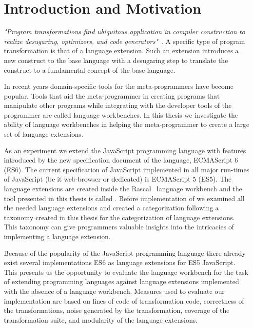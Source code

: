 
\chapter{Introduction and Motivation}

\label{Chapter1}


\textit{"Program transformations find ubiquitous application in compiler construction to realize desugaring, optimizers, and code generators"}~\cite{Erdweg2014}. A specific type of program transformation is that of a language extension. Such an extension introduces a new construct to the base language with a desugaring step to translate the construct to a fundamental concept of the base language. 

In recent years domain-specific tools for the meta-programmers have become popular. Tools that aid the meta-programmer in creating programs that manipulate other programs while integrating with the developer tools of the programmer are called language workbenches. In this thesis we investigate the ability of language workbenches in helping the meta-programmer to create a large set of language extensions. 

As an experiment we extend the JavaScript programming language with features introduced by the new specification document of the language, ECMAScript 6 (ES6). The current specification of JavaScript implemented in all major run-times of JavaScript (be it web-browser or dedicated) is ECMAScript 5 (ES5). The language extensions are created inside the Rascal~\cite{Klinta} language workbench and the tool presented in this thesis is called \projectname. Before implementation of \projectname we examined all the needed language extensions and created a categorization following a taxonomy created in this thesis for the categorization of language extensions. This taxonomy can give programmers valuable insights into the intricacies of implementing a language extension.

Because of the popularity of the JavaScript programming language there already exist several implementations ES6 as language extensions for ES5 JavaScript. This presents us the opportunity to evaluate the language workbench for the task of extending programming languages against language extensions implemented with the absence of a language workbench.  
Measures used to evaluate our implementation are based on lines of code of transformation code, correctness of the transformations, noise generated by the transformation, coverage of the transformation suite, and modularity of the language extensions.

